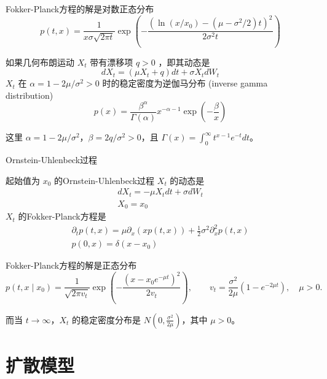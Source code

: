 Fokker-Planck方程的解是对数正态分布
$$
p(t, x)=\frac{1}{x \sigma \sqrt{2 \pi t}} \exp \left(-\frac{\left(\ln \left(x / x_0\right)-\left(\mu-\sigma^2 / 2\right) t\right)^2}{2 \sigma^2 t}\right)
$$

如果几何布朗运动 $X_t$ 带有漂移项 $q>0$ ，即其动态是
$$
d X_t=\left(\mu X_t+q\right) d t+\sigma X_t d W_t
$$
$X_t$ 在 $\alpha=1-2\mu/\sigma^2>0$ 时的稳定密度为逆伽马分布 (inverse gamma distribution)
$$
p(x)=\frac{\beta^\alpha}{\Gamma(\alpha)} x^{-\alpha-1} \exp \left(-\frac{\beta}{x}\right)
$$

这里 $\alpha=1-2\mu/\sigma^2$，$\beta=2q/\sigma^2>0$，且 $\Gamma(x)=\int_0^{\infty}t^{x-1}e^{-t}dt$。

Ornstein-Uhlenbeck过程

起始值为 $x_0$ 的Ornstein-Uhlenbeck过程 $X_t$ 的动态是
$$
\begin{gathered}
d X_t=-\mu X_t d t+\sigma d W_t \\
X_0=x_0
\end{gathered}
$$
$X_t$ 的Fokker-Planck方程是
$$
\begin{gathered}
\partial_t p(t, x)=\mu \partial_x(x p(t, x))+\frac{1}{2} \sigma^2 \partial_x^2 p(t, x) \\
p(0, x)=\delta\left(x-x_0\right)
\end{gathered}
$$

Fokker-Planck方程的解是正态分布
$$
p(t,x\mid x_0)=\frac{1}{\sqrt{2\pi v_t}}
\exp\left(-\frac{(x-x_0 e^{-\mu t})^2}{2v_t}\right),
\qquad v_t=\frac{\sigma^2}{2\mu}(1-e^{-2\mu t}),\quad\mu>0.
$$

而当 $t\rightarrow\infty$，$X_t$ 的稳定密度分布是 $N\left(0,\frac{\sigma^2}{2\mu}\right)$，其中 $\mu>0$。





\chapter{扩散模型}

